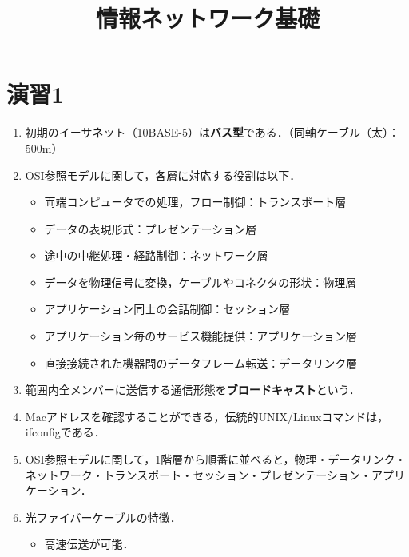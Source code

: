 \documentclass[paper=a4,10pt,twocolumn]{jlreq}
\title{\vspace{-2cm}情報ネットワーク基礎}
\author{}
\date{}
\begin{document}
\newcommand{\ci}{◯}
\newcommand{\bt}{×}
\section*{演習1}
\begin{enumerate}
    \renewcommand{\theenumi}{\arabic{enumi}}
    \renewcommand{\labelenumi}{\textbf{{\theenumi}.}\ }
    \item 初期のイーサネット（10BASE-5）は\textbf{バス型}である．（同軸ケーブル（太）：500m）
    \item OSI参照モデルに関して，各層に対応する役割は以下．
          \begin{itemize}
              \item 両端コンピュータでの処理，フロー制御：トランスポート層
              \item データの表現形式：プレゼンテーション層
              \item 途中の中継処理・経路制御：ネットワーク層
              \item データを物理信号に変換，ケーブルやコネクタの形状：物理層
              \item アプリケーション同士の会話制御：セッション層
              \item アプリケーション毎のサービス機能提供：アプリケーション層
              \item 直接接続された機器間のデータフレーム転送：データリンク層
          \end{itemize}
    \item 範囲内全メンバーに送信する通信形態を\textbf{ブロードキャスト}という．
    \item Macアドレスを確認することができる，伝統的UNIX/Linuxコマンドは，{\ttfamily ifconfig}である．
    \item OSI参照モデルに関して，1階層から順番に並べると，物理・データリンク・ネットワーク・トランスポート・セッション・プレゼンテーション・アプリケーション．
    \item 光ファイバーケーブルの特徴．
          \begin{itemize}
              \item 高速伝送が可能．

\end{itemize}
\end{enumerate}
\end{document}
